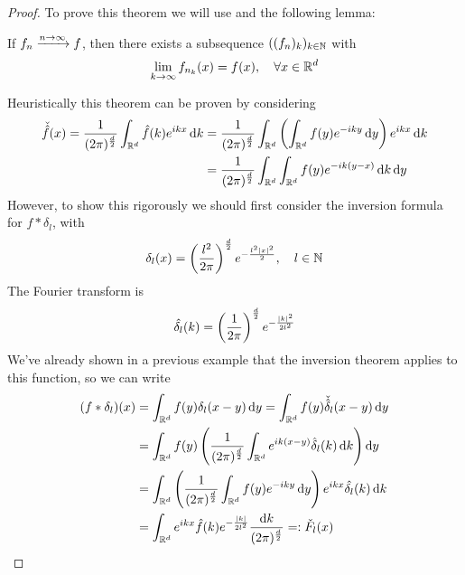 \documentclass[../../script.tex]{subfiles}
\begin{document}
\begin{proof}
    To prove this theorem we will use  and the following lemma:
    \bigbreak
    \begin{itshape}
        If $f_n \conv{n \rightarrow \infty} f$, then there exists a subsequence $((f_n)_k)_{k \in \mathbb{N}}$ with 
        \[
            \lim_{k \rightarrow \infty} f_{n_k} (x) = f(x), \quad \forall x \in \mathbb{R}^d
        \]
    \end{itshape}
    \bigbreak
    Heuristically this theorem can be proven by considering 
    \begin{equation}
        \begin{split}
            \check{\hat{f}}(x) = \frac{1}{(2\pi)^{\frac{d}{2}}} \int_{\mathbb{R}^d} \hat{f}(k) e^{ikx} \dd{k} 
            &= \frac{1}{(2\pi)^{\frac{d}{2}}} \int_{\mathbb{R}^d} \left( \int_{\mathbb{R}^d} f(y) e^{-iky} \dd{y} \right) e^{ikx} \dd{k} \\
            &= \frac{1}{(2\pi)^{\frac{d}{2}}} \int_{\mathbb{R}^d} \int_{\mathbb{R}^d} f(y) e^{-ik(y - x)} \dd{k} \dd{y}
        \end{split}
    \end{equation}
    However, to show this rigorously we should first consider the inversion formula for $f * \delta_l$, with
    \begin{equation}
        \delta_l (x) = \left( \frac{l^2}{2\pi} \right)^{\frac{d}{2}} e^{-\frac{l^2 \abs{x}^2}{2}}, \quad l \in \mathbb{N}
    \end{equation}
    The Fourier transform is 
    \begin{equation}
        \hat{\delta_l} (k) = \left(\frac{1}{2\pi}\right)^{\frac{d}{2}} e^{-\frac{\abs{k}^2}{2l^2}}
    \end{equation}
    We've already shown in a previous example that the inversion theorem applies to this function, so we can write 
    \begin{equation}
        \begin{split}
            (f * \delta_l)(x) &= \int_{\realn^d} f(y) \delta_l(x - y) \dd{y} = \int_{\realn^d} f(y) \check{\hat{\delta}}_l(x - y) \dd{y} \\
            &= \int_{\realn^d} f(y) \left( \rec{(2\pi)^{\frac{d}{2}}} \int_{\realn^d} e^{ik(x - y)} \hat{\delta}_l (k) \dd{k} \right) \dd{y}\\
            &= \int_{\realn^d} \left(\rec{(2\pi)^{\frac{d}{2}}} \int_{\realn^d} f(y) e^{-iky} \dd{y} \right) e^{ikx} \hat{\delta_l} (k) \dd{k} \\
            &= \int_{\realn^d} e^{ikx} \hat{f}(k) e^{-\frac{\abs{k}}{2l^2}} \frac{\dd{k}}{(2\pi)^{\frac{d}{2}}} =: \check{F}_l(x)

\end{split}
\end{equation}
\end{proof}
\end{document}
